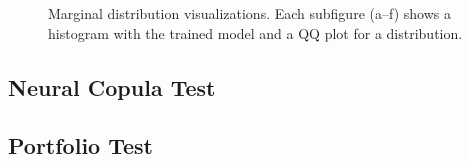 \begin{figure}
    \caption{Marginal distribution visualizations. Each subfigure (a--f) shows a histogram with the trained model and a QQ plot for a distribution.}
    \label{fig:MarginalResults}
\end{figure}









\subsection{Neural Copula Test}

\subsection{Portfolio Test}
